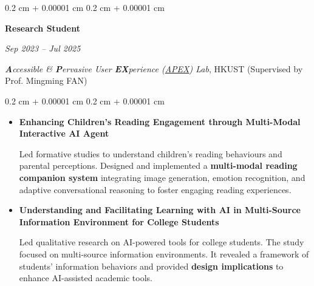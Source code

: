 \documentclass[10pt, letterpaper]{article}
\newenvironment{highlights}{
    \begin{itemize}[
        topsep=0.10 cm,
        parsep=0.10 cm,
        partopsep=0pt,
        itemsep=0pt,
        leftmargin=0.4 cm + 10pt
    ]
}{
    \end{itemize}
} %
\newenvironment{onecolentry}{
    \begin{adjustwidth}{
        0.2 cm + 0.00001 cm
    }{
        0.2 cm + 0.00001 cm
    }
}{
    \end{adjustwidth}
} %
\newenvironment{twocolentry}[2][]{
    \onecolentry
    \def\secondColumn{#2}
    \setcolumnwidth{\fill, 4.5 cm}
    \begin{paracol}{2}
}{
    \switchcolumn \raggedleft \secondColumn
    \end{paracol}
    \endonecolentry
} %
\let\hrefWithoutArrow\href
\renewcommand{\href}[2]{\hrefWithoutArrow{#1}{\ifthenelse{\equal{#2}{}}{ }{#2 }\raisebox{.15ex}{\footnotesize \faExternalLink*}}}
\renewcommand{\href}[2]{\hrefWithoutArrow{#1}{#2}}
\begin{document}

        \begin{twocolentry}{
        \textit{Sep 2023 – Jul 2025}}
            \textbf{Research Student}
        \end{twocolentry}
        \hspace{0.2cm}\textit{\textbf{A}ccessible \& \textbf{P}ervasive User \textbf{EX}perience (\href{https://www.mingmingfan.com/lab/}{APEX}) Lab}, HKUST (Supervised by Prof. Mingming FAN)


        \vspace{0.10 cm}
        \begin{onecolentry}
            \begin{highlights}
                \item \textbf{Enhancing Children’s Reading Engagement through Multi-Modal Interactive AI Agent}
                
                Led formative studies to understand children's reading behaviours and parental perceptions. Designed and implemented a \textbf{multi-modal reading companion system} integrating image generation, emotion recognition, and adaptive conversational reasoning to foster engaging reading experiences.
                \item \textbf{Understanding and Facilitating Learning with AI in Multi-Source Information Environment for College Students}
                
                Led qualitative research on AI-powered tools for college students. The study focused on multi-source information environments. It revealed a framework of students' information behaviors and provided \textbf{design implications} to enhance AI-assisted academic tools.
                        

\end{highlights}
\end{onecolentry}
\end{document}
